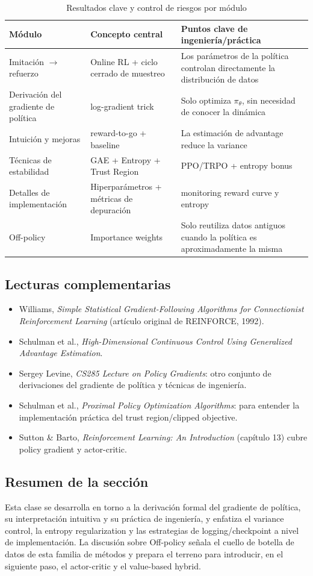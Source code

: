 \documentclass[a4paper]{article}
\begin{document}
\begin{table}[H]
\centering
\small
\begin{tabular}{p{}p{}p{}}
\toprule
Módulo & Concepto central & Puntos clave de ingeniería/práctica \\
\midrule
Imitación \(\to\) refuerzo & Online RL + ciclo cerrado de muestreo & Los parámetros de la política controlan directamente la distribución de datos \\
Derivación del gradiente de política & log-gradient trick & Solo optimiza \(\pi_\theta\), sin necesidad de conocer la dinámica \\
Intuición y mejoras & reward-to-go + baseline & La estimación de advantage reduce la variance \\
Técnicas de estabilidad & GAE + Entropy + Trust Region & PPO/TRPO + entropy bonus \\
Detalles de implementación & Hiperparámetros + métricas de depuración & monitoring reward curve y entropy \\
Off-policy & Importance weights & Solo reutiliza datos antiguos cuando la política es aproximadamente la misma \\
\bottomrule
\end{tabular}
\caption{Resultados clave y control de riesgos por módulo}
\end{table}

\subsection{Lecturas complementarias}
\begin{itemize}
    \item Williams, \textit{Simple Statistical Gradient-Following Algorithms for Connectionist Reinforcement Learning} (artículo original de REINFORCE, 1992).
    \item Schulman et al., \textit{High-Dimensional Continuous Control Using Generalized Advantage Estimation}.
    \item Sergey Levine, \textit{CS285 Lecture on Policy Gradients}: otro conjunto de derivaciones del gradiente de política y técnicas de ingeniería.
    \item Schulman et al., \textit{Proximal Policy Optimization Algorithms}: para entender la implementación práctica del trust region/clipped objective.
    \item Sutton \& Barto, \textit{Reinforcement Learning: An Introduction} (capítulo 13) cubre policy gradient y actor-critic.
\end{itemize}

\subsection{Resumen de la sección}
Esta clase se desarrolla en torno a la derivación formal del gradiente de política, su interpretación intuitiva y su práctica de ingeniería, y enfatiza el variance control, la entropy regularization y las estrategias de logging/checkpoint a nivel de implementación. La discusión sobre Off-policy señala el cuello de botella de datos de esta familia de métodos y prepara el terreno para introducir, en el siguiente paso, el actor-critic y el value-based hybrid.
\end{document}
